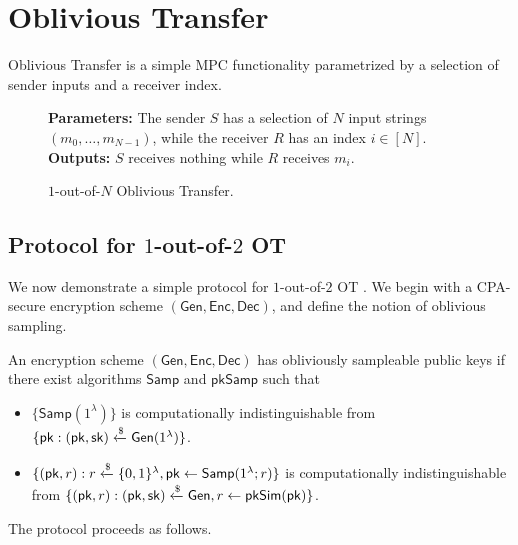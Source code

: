 \section{Oblivious Transfer}

Oblivious Transfer is a simple MPC functionality parametrized by a selection of sender inputs and a receiver index. 

\begin{figure}[h]
	\begin{mdframed}[
		linecolor=black,
		linewidth=1pt,
		roundcorner=5pt,
		backgroundcolor=white,
		userdefinedwidth=\textwidth,
		]
		\vspace{2mm}
		\textbf{Parameters:} The sender $S$ has a selection of $N$ input strings $(m_0,\dots,m_{N-1})$, while the receiver $R$ has an index $i\in[N]$.\\
		\textbf{Outputs:} $S$ receives nothing while $R$ receives $m_i$.
		\vspace{2mm}
	\end{mdframed}
	\caption{$1$-out-of-$N$ Oblivious Transfer.}
	\label{fig:OT}
\end{figure}

\subsection{Protocol for $1$-out-of-$2$ OT}

We now demonstrate a simple protocol for $1$-out-of-$2$ OT \cite{esgot}. We begin with a CPA-secure encryption scheme $(\mathsf{Gen},\mathsf{Enc},\mathsf{Dec})$, and define the notion of oblivious sampling.

\begin{definition}
	An encryption scheme $(\mathsf{Gen},\mathsf{Enc},\mathsf{Dec})$ has obliviously sampleable public keys if there exist algorithms $\mathsf{Samp}$ and $\mathsf{pkSamp}$ such that 
	\begin{itemize}
		\item $\{\mathsf{Samp}(1^\lambda)\}$ is computationally indistinguishable from $\{\mathsf{pk}:(\mathsf{pk},\mathsf{sk})\xleftarrow{\$}\mathsf{Gen}(1^\lambda)\}$.
		\item $\{(\mathsf{pk},r):r\xleftarrow{\$}\{0,1\}^\lambda, \mathsf{pk}\leftarrow\mathsf{Samp}(1^\lambda;r)\}$ is computationally indistinguishable from $\{(\mathsf{pk},r):(\mathsf{pk},\mathsf{sk})\xleftarrow{\$}\mathsf{Gen}, r\gets\mathsf{pkSim}(\mathsf{pk})\}$.
	\end{itemize}
\end{definition}

The protocol proceeds as follows.

